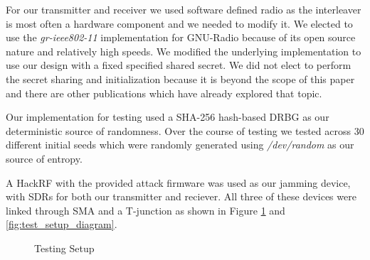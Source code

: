 \documentclass[sigconf]{acmart}
\begin{document}
For our transmitter and receiver we used software defined radio as the interleaver is most often a hardware component and we needed to modify it. We elected to use the \textit{gr-ieee802-11} implementation for GNU-Radio because of its open source nature and relatively high speeds. We modified the underlying implementation to use our design with a fixed specified shared secret. We did not elect to perform the secret sharing and initialization because it is beyond the scope of this paper and there are other publications which have already explored that topic. 

Our implementation for testing used a SHA-256 hash-based DRBG as our deterministic source of randomness. Over the course of testing we tested across 30 different initial seeds which were randomly generated using \textit{/dev/random} as our source of entropy. 

A HackRF with the provided attack firmware was used as our jamming device, with SDRs for both our transmitter and reciever. All three of these devices were linked through SMA and a T-junction as shown in Figure \ref{fig:test_setup} and \ref{fig:test_setup_diagram}.

\begin{figure}[h]
    \centering
    \caption{Testing Setup}
    \label{fig:test_setup}
\end{figure}
\end{document}
